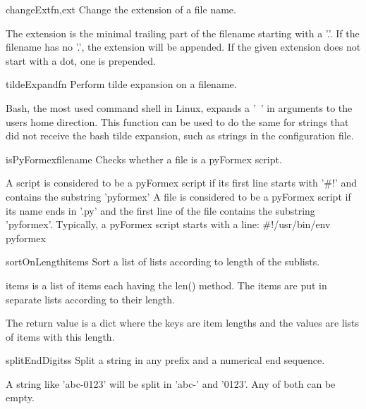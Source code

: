 \begin{funcdesc}{changeExt}{fn,ext}
Change the extension of a file name.

    The extension is the minimal trailing part of the filename starting
    with a '.'. If the filename has no '.', the extension will be appended.
    If the given extension does not start with a dot, one is prepended.
    
\end{funcdesc}

\begin{funcdesc}{tildeExpand}{fn}
Perform tilde expansion on a filename.

    Bash, the most used command shell in Linux, expands a '~' in arguments
    to the users home direction.
    This function can be used to do the same for strings that did not receive
    the bash tilde expansion, such as strings in the configuration file.
    
\end{funcdesc}

\begin{funcdesc}{isPyFormex}{filename}
Checks whether a file is a pyFormex script.

    A script is considered to be a pyFormex script if its first line
    starts with '\#!' and contains the substring 'pyformex'
    A file is considered to be a pyFormex script if its name ends in '.py'
    and the first line of the file contains the substring 'pyformex'.
    Typically, a pyFormex script starts with a line:
      \#!/usr/bin/env pyformex
    
\end{funcdesc}

\begin{funcdesc}{sortOnLength}{items}
Sort a list of lists according to length of the sublists.

    items is a list of items each having the len() method.
    The items are put in separate lists according to their length.

    The return value is a dict where the keys are item lengths and
    the values are lists of items with this length.
    
\end{funcdesc}

\begin{funcdesc}{splitEndDigits}{s}
Split a string in any prefix and a numerical end sequence.

    A string like 'abc-0123' will be split in 'abc-' and '0123'.
    Any of both can be empty.
    
\end{funcdesc}

